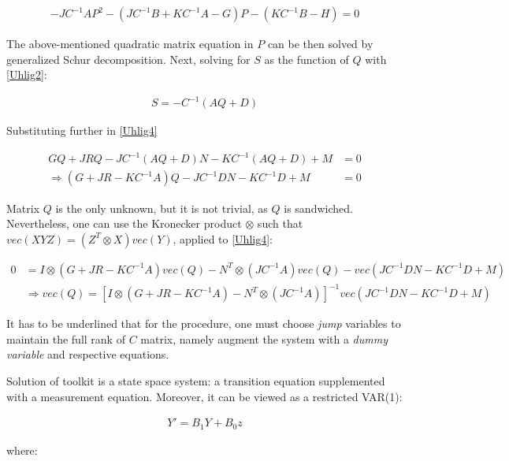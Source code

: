 \documentclass{pracamgr}
\numberwithin{equation}{section}
\begin{document}
\begin{align}
-JC^{-1}AP^{2} - \left(JC^{-1}B + KC^{-1}A - G \right)P - \left(KC^{-1}B - H \right) = 0
\end{align} 

The above-mentioned quadratic matrix equation in $P$ can be then solved by generalized Schur decomposition. Next, solving for $S$ as the function of $Q$ with \ref{Uhlig2}:

\begin{align}
S = -C^{-1} \left(AQ + D \right)
\end{align}

Substituting further in \ref{Uhlig4}

\begin{align}
GQ+JRQ-JC^{-1} (AQ+D)N - KC^{-1} (AQ+D)+M &= 0 \nonumber \\
\Rightarrow \left(G + JR - KC^{-1}A \right)Q - JC^{-1}DN - KC^{-1}D + M &= 0
\end{align}

Matrix $Q$ is the only unknown, but it is not trivial, as $Q$ is sandwiched. Nevertheless, one can use the Kronecker product $\otimes$ such that $vec \left(XYZ\right) = \left(Z^{T} \otimes X \right) vec(Y)$, applied to \ref{Uhlig4}:

\begin{align}
0 &= I \otimes \left(G + JR - KC^{-1}A \right) vec(Q) - N^{T} \otimes \left(JC^{-1}A\right) vec(Q) - vec\left(JC^{-1}DN - KC^{-1}D + M \right) \nonumber \\
& \Rightarrow vec(Q) = \left[ I \otimes \left(G + JR - KC^{-1}A \right) - N^{T} \otimes \left(JC^{-1}A \right)\right]^{-1} vec\left(JC^{-1}DN - KC^{-1}D + M \right)
\end{align}

It has to be underlined that for the \citet{uhlig1998toolkit} procedure, one must choose \textit{jump} variables to maintain the full rank of $C$ matrix, namely augment the system with a \textit{dummy variable} and respective equations.

Solution of \citet{uhlig1998toolkit} toolkit is a state space system: a transition equation supplemented with a measurement equation. Moreover, it can be viewed as a restricted VAR(1):

\begin{align}
Y' = B_{1}Y+ B_{0}z
\end{align}

where:
\end{document}
